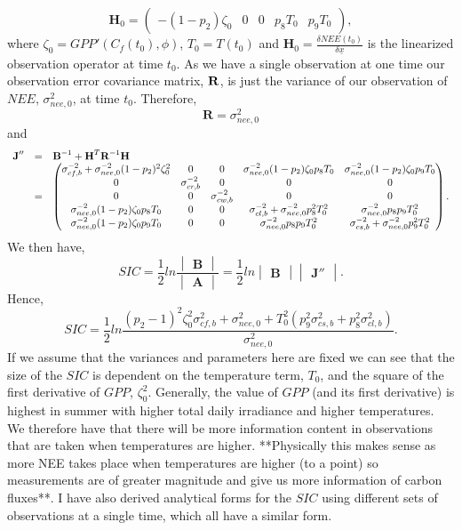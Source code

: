 \documentclass[11pt]{article}
\begin{document}
\[
\textbf{H}_{0} = \begin{pmatrix}
-(1-p_{2})\zeta_0 & 0 & 0 & p_{8}T_{0} & p_{9}T_{0}
\end{pmatrix},
\]  
where $\zeta_0 = GPP'(C_f(t_0), \phi)$, $T_{0}=T(t_0)$ and $\textbf{H}_{0}=\frac{\delta NEE(t_0)}{\delta\underline{x}}$ is the linearized observation operator at time $t_0$. As we have a single observation at one time our observation error covariance matrix, $\bf{R}$, is just the variance of our observation of $NEE$, $\sigma_{nee,0}^{2}$, at time $t_0$. Therefore,
\[
\textbf{R}=\sigma_{nee,0}^{2}
\]  
and
\[
\begin{array} {lcl}
\textbf{J}'' &=& \textbf{B}^{-1}+\textbf{H}^{T}\textbf{R}^{-1}\bf{H} \\
&=& \begin{pmatrix} 
\sigma_{cf,b}^{-2}+\sigma_{nee,0}^{-2}(1-p_{2})^{2}\zeta_0^{2} & 0 & 0 & \sigma_{nee,0}^{-2}(1-p_{2})\zeta_0 p_{8}T_0 & \sigma_{nee,0}^{-2}(1-p_{2})\zeta_0 p_{9}T_0 \\
0 & \sigma_{cr,b}^{-2} & 0 & 0 & 0 \\
0 & 0 & \sigma_{cw,b}^{-2} & 0 & 0 \\
\sigma_{nee,0}^{-2}(1-p_{2})\zeta_0 p_{8}T_0 & 0 & 0 & \sigma_{cl,b}^{-2}+\sigma_{nee,0}^{-2}p_{8}^2 T_0^2 & \sigma_{nee,0}^{-2}p_{8}p_{9} T_0^2 \\
\sigma_{nee,0}^{-2}(1-p_{2})\zeta_0 p_{9}T_0 & 0 & 0 & \sigma_{nee,0}^{-2}p_{8}p_{9} T_0^2 & \sigma_{cs,b}^{-2}+\sigma_{nee,0}^{-2}p_{9}^2 T_0^2 \\
\end{pmatrix}.
\end{array}
\] 
We then have,
\[
SIC=\frac{1}{2}ln\frac{\begin{vmatrix} \textbf{B} \end{vmatrix}}{\begin{vmatrix} \textbf{A} \end{vmatrix}} = \frac{1}{2}ln\begin{vmatrix} \textbf{B} \end{vmatrix}\begin{vmatrix} \textbf{J}'' \end{vmatrix}.
\]
Hence,
\[
SIC = \frac{1}{2}ln\frac{(p_{2}-1)^{2}\zeta_0^{2}\sigma_{cf,b}^{2}+\sigma_{nee,0}^{2}+T_{0}^2(p_{9}^2\sigma_{cs,b}^2+p_8^2\sigma_{cl,b}^2)}{\sigma_{nee,0}^{2}}.
\]
If we assume that the variances and parameters here are fixed we can see that the size of the $SIC$ is dependent on the temperature term, $T_0$, and the square of the first derivative of $GPP$, $\zeta_0^{2}$. Generally, the value of $GPP$ (and its first derivative) is highest in summer with higher total daily irradiance and higher temperatures. We therefore have that there will be more information content in observations that are taken when temperatures are higher. **Physically this makes sense as more NEE takes place when temperatures are higher (to a point) so measurements are of greater magnitude and give us more information of carbon fluxes**. I have also derived analytical forms for the $SIC$ using different sets of observations at a single time, which all have a similar form.
\end{document}
